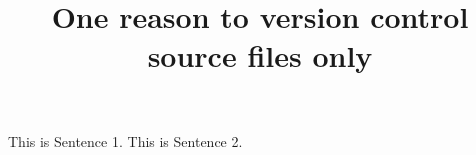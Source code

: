 \documentclass{article}
\title{One reason to version control source files only}
\begin{document}
\maketitle


This is Sentence 1.
This is Sentence 2.
\end{document}

